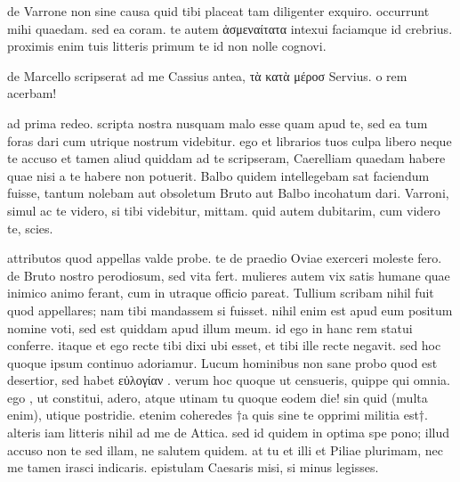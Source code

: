 


 de Varrone non sine causa quid tibi placeat tam diligenter exquiro. occurrunt mihi quaedam. sed ea coram. te autem ἀσμεναίτατα intexui faciamque id crebrius. proximis enim tuis litteris primum te id non nolle cognovi.

 de Marcello scripserat ad me Cassius antea, τὰ κατὰ μέροσ Servius. o rem acerbam!

 ad prima redeo. scripta nostra nusquam malo esse quam apud te, sed ea tum foras dari cum utrique nostrum videbitur. ego et librarios tuos culpa libero neque te accuso et tamen aliud quiddam ad te scripseram, Caerelliam quaedam habere quae nisi a te habere non potuerit. Balbo quidem intellegebam sat faciendum fuisse, tantum nolebam aut obsoletum Bruto aut Balbo incohatum dari. Varroni, simul ac te videro, si tibi videbitur, mittam. quid autem dubitarim, cum videro te, scies.

 attributos quod appellas valde probe. te de praedio Oviae exerceri moleste fero. de Bruto nostro perodiosum, sed vita fert. mulieres autem vix satis humane quae inimico animo ferant, cum in utraque officio pareat. Tullium scribam nihil fuit quod appellares; nam tibi mandassem si fuisset. nihil enim est apud eum positum nomine voti, sed est quiddam apud illum meum. id ego in hanc rem statui conferre. itaque et ego recte tibi dixi ubi esset, et tibi ille recte negavit. sed hoc quoque ipsum continuo adoriamur. Lucum hominibus non sane probo quod est desertior, sed habet εὐλογίαν . verum hoc quoque ut censueris, quippe qui omnia. ego , ut constitui, adero, atque utinam tu quoque eodem die! sin quid (multa enim), utique postridie. etenim coheredes †a quis sine te opprimi militia est†. alteris iam litteris nihil ad me de Attica. sed id quidem in optima spe pono; illud accuso non te sed illam, ne salutem quidem. at tu et illi et Piliae plurimam, nec me tamen irasci indicaris. epistulam Caesaris misi, si minus legisses.
